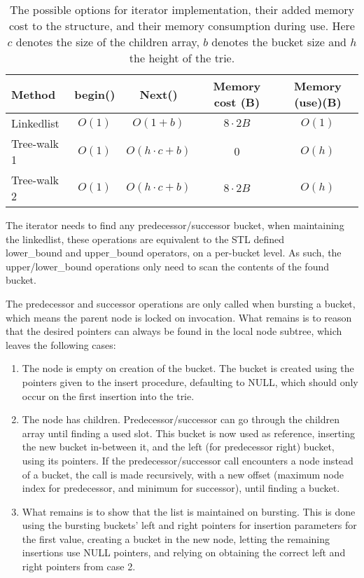 \begin{table}[h!]
    \centering
    \begin{tabular}[here]{ l | c | c | c | c}
        Method      & begin()  & Next()           & Memory cost (B) & Memory (use)(B) \\ \hline
        Linkedlist  & $O(1)$ & $O(1 + b) $        & $8\cdot2B$      & $O(1)$ \\ \hline
        Tree-walk 1 & $O(1)$ & $O(h \cdot c + b)$ & $0$             & $O(h)$ \\ \hline
        Tree-walk 2 & $O(1)$ & $O(h \cdot c + b)$ & $8\cdot2B$      & $O(h)$ \\ \hline
    \end{tabular}
    \caption{The possible options for iterator implementation, their added memory cost
        to the structure, and their memory consumption during use. Here $c$ denotes
        the size of the children array, $b$ denotes the bucket size and $h$ the height
        of the trie.}

    \label{tab:stats:iterator}
\end{table}

The iterator needs to find any predecessor/successor bucket, when maintaining
the linkedlist, these operations are equivalent to the STL defined \\lower\_bound
and upper\_bound operators, on a per-bucket level. As such, the {\keyword
upper/lower\_bound} operations only need to scan the contents of the found
bucket.

The predecessor and successor operations are only called when bursting a bucket,
which means the parent node is locked on invocation. What remains is to reason
that the desired pointers can always be found in the local node subtree,
which leaves the following cases:
\begin{enumerate}
    \item The node is empty on creation of the bucket. The bucket is
    created using the pointers given to the insert procedure, defaulting to
    {\keyword NULL}, which should only occur on the first insertion into the trie.
    \item The node has children. Predecessor/successor can go through
    the children array until finding a used slot. This bucket is now used as
    reference, inserting the new bucket in-between it, and the left (for
    predecessor right) bucket, using its pointers. If the predecessor/successor
    call encounters a node instead of a bucket, the call is made recursively,
    with a new offset (maximum node index for predecessor, and minimum for successor),
    until finding a bucket.
    \item  What remains is to show that the list is maintained on bursting.
    This is done using the bursting buckets' left and right pointers for insertion
    parameters for the first value, creating a bucket in the new node, letting the
    remaining insertions use {\keyword NULL} pointers, and relying on obtaining the
    correct left and right pointers from case 2.
\end{enumerate}

